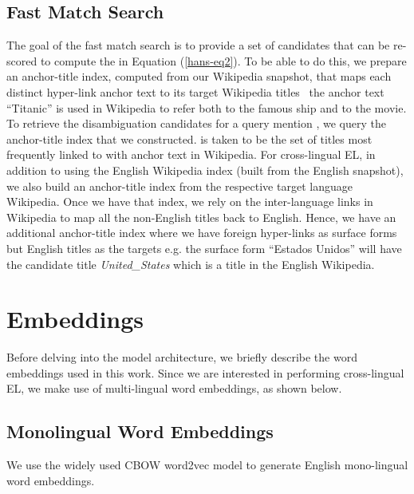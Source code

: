 \documentclass[letterpaper]{article} \usepackage{aaai18}  \usepackage{times}  \usepackage{helvet}  \usepackage{courier}  \usepackage{url}  \usepackage{graphicx}  \frenchspacing  \setlength{\pdfpagewidth}{8.5in}  \setlength{\pdfpageheight}{11in}  \usepackage{latexsym}
\begin{document}
\subsection{Fast Match Search}
\label{sec:fast-match}
The goal of the fast match search is to provide a set of candidates that can be re-scored to compute the  in Equation (\ref{hans-eq2}). To be able to do this, we prepare an anchor-title index, computed from our Wikipedia snapshot, that
maps each distinct hyper-link anchor text to its target Wikipedia titles \eg\ the anchor text ``Titanic” is used in Wikipedia to refer both to the
famous ship and to the movie. To retrieve the disambiguation candidates  for
a query mention , we query the anchor-title index that we constructed. 
is taken to be the set of titles most frequently linked to with anchor
text  in Wikipedia. For cross-lingual EL, in addition to using the English Wikipedia index (built from the English snapshot), we also build an anchor-title index from the respective target language Wikipedia. Once we have that index, we rely on the inter-language links in Wikipedia to map all the non-English titles back to English. Hence, we have an additional anchor-title index where we have foreign hyper-links as surface forms but English titles as the targets e.g. the surface form ``Estados Unidos'' will have the candidate title \textit{United\_States} which is a title in the English Wikipedia. \section{Embeddings}
Before delving into the model architecture, we briefly describe the word embeddings used in this work. 
Since we are interested in performing cross-lingual EL, we make use of multi-lingual word embeddings, as shown below.
\label{sec:embeddings}


\subsection{Monolingual Word Embeddings}
\label{sec:mono-emb}
We use the widely used CBOW word2vec model \cite{mikolov2013efficient} to generate English mono-lingual word embeddings.
\end{document}

